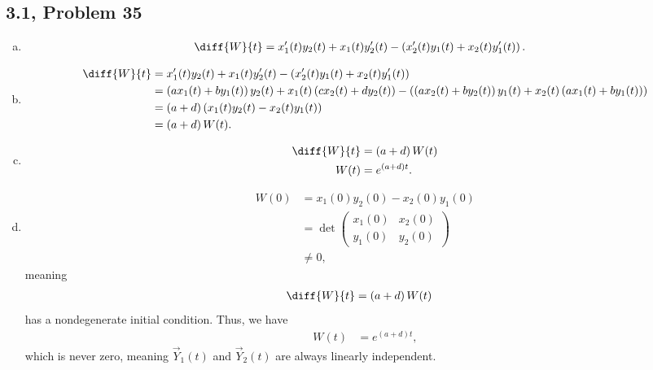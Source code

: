 \documentclass[10pt]{mypackage}
\begin{document}
\subsection{3.1, Problem 35}%
\begin{enumerate}[(a)]
  \item 
    \begin{align*}
      \diff{W}{t} &= x_1'(t)y_2(t) + x_1(t)y_2'(t) - \left(x_2'(t)y_1(t) + x_2(t)y_1'(t)\right).
    \end{align*}
  \item 
    \begin{align*}
      \diff{W}{t} &= x_1'(t)y_2(t) + x_1(t)y_2'(t) - \left(x_2'(t)y_1(t) + x_2(t)y_1'(t)\right)\\
                  &= \left(ax_1(t) + by_1(t)\right)y_2(t) + x_1(t)\left(cx_2(t) + dy_2(t)\right) - \left(\left(ax_2(t) + by_2(t)\right)y_1(t) + x_2(t)\left(ax_1(t) + by_1(t)\right)\right)\\
                  &= \left(a+d\right)\left(x_1(t)y_2(t) - x_2(t)y_1(t)\right)\\
                  &= \left(a+d\right)W(t).
    \end{align*}
  \item 
    \begin{align*}
      \diff{W}{t} &= \left(a+d\right)W(t)\\
      W(t)  &= e^{\left(a+d\right)t}.
    \end{align*}
  \item 
    \begin{align*}
      W(0) &= x_1(0)y_2(0) - x_2(0)y_1(0)\\
           &= \det \begin{pmatrix}x_1(0) & x_2(0) \\ y_1(0) & y_2(0)\end{pmatrix}\\
           &\neq 0,
    \end{align*}
    meaning
    \begin{align*}
      \diff{W}{t} &= \left(a+d\right)W(t)
    \end{align*}
    has a nondegenerate initial condition. Thus, we have
    \begin{align*}
      W(t) &= e^{\left(a+d\right)t},
    \end{align*}
    which is never zero, meaning $\vec{Y}_1(t)$ and $\vec{Y}_2(t)$ are always linearly independent.
\end{enumerate}
\end{document}

